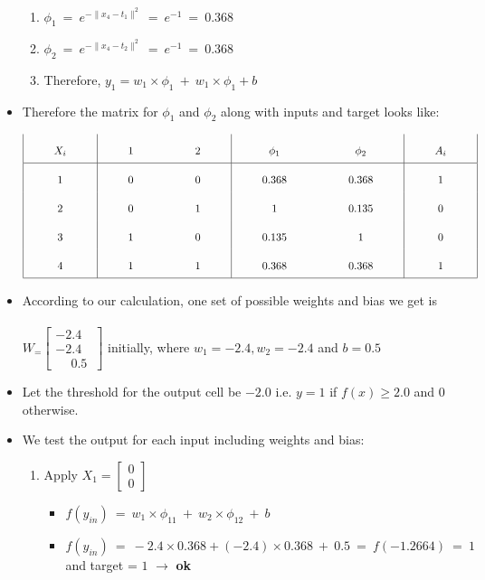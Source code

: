 \documentclass[12pt]{article}
\begin{document}
\begin{itemize}
	\begin{enumerate}
		\item $\phi_{1} \ = \ e^{-\parallel x_4- t_1 \parallel ^ 2}  \ = \ e^{-1} \ = \ 0.368 $
		\item $\phi_{2} \ = \ e^{-\parallel x_4- t_2 \parallel ^ 2}  \ = \ e^{-1} \ = \ 0.368 $
		
		\item Therefore, $ y_1 = w_1 \times \phi_{1} \ + \ w_1 \times \phi_{1} + b$
	\end{enumerate}
	
	\item Therefore the matrix for $\phi_{1}$ and $\phi_{2}$ along with inputs and target looks like:
	
		\[\arraycolsep=1cm\def\arraystretch{2.2}
	\begin{array}{|c|c c|c c|c|}
		X_i & 1 & 2 & \phi_1 & \phi_2 &  A_i\\
		\hline 
		1 & 0 & 0 & 0.368 & 0.368 & 1\\
		2 & 0 & 1 & 1 & 0.135 &  0\\ 
		3 & 1 & 0 & 0.135 & 1 & 0\\
		4 & 1 & 1 & 0.368 & 0.368 & 1\\
		\hline
	\end{array}\]
	
	\item According to our calculation, one set of possible weights and bias we get is 	\\ \\ $ W_ = \begin{bmatrix}
		-2.4 \\ -2.4 \\ \phantom{-}0.5 \
	\end{bmatrix}$ initially, where $w_1 = -2.4, w_2 = -2.4$ and $b = 0.5$
	
	\item Let the threshold for the output cell be $-2.0$ i.e. $y = 1 $ if $f(x) \geq 2.0$ and $0$ otherwise.
	
	\item We test the output for each input including weights and bias:
	
	\begin{enumerate}
		\item Apply $X_1 = \begin{bmatrix}
			0 \\ 0
		\end{bmatrix}$ 
	
		\begin{itemize}[label=$\rightarrow$]
			\item $f(y_{in}) \ = \ w_1 \times \phi_{11} \ + \ w_2 \times \phi_{12}  \ + \ b $ 
			\item $ f(y_{in}) \ = \ -2.4 \times 0.368 + (-2.4) \times 0.368 \ + \ 0.5 \ = \ f(-1.2664) \ = \ 1 $  and target = $1$ $\rightarrow$  \textbf{ok}
		

\end{itemize}
\end{enumerate}
\end{itemize}
\end{document}
